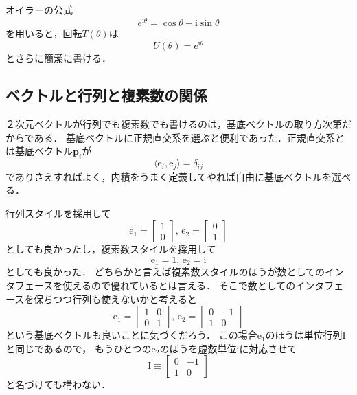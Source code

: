\documentclass{jsbook}
\newcommand{\one}{1}%
\newcommand{\One}{\mathrm{I}}%
\newcommand{\im}{\mathrm{i}}%
\newcommand{\I}{\mathrm{I}}%
\newcommand{\ee}{\mathit{e}}
\newcommand{\bvec}[1]{\boldsymbol{#1}}
\newcommand{\ve}{\mathrm{e}}
\begin{document}
オイラーの公式
\begin{equation}
\ee^{\im\theta}=\cos\theta+\im\sin\theta
\end{equation}
を用いると，回転$T(\theta)$は
\begin{equation}
U(\theta)=\ee^{\im\theta}
\end{equation}
とさらに簡潔に書ける．

\subsection{ベクトルと行列と複素数の関係}

２次元ベクトルが行列でも複素数でも書けるのは，基底ベクトルの取り方次第だからである．
基底ベクトルに正規直交系を選ぶと便利であった．正規直交系とは基底ベクトル$\bvec{p}_i$が
\begin{equation}
\langle\ve_i,\ve_j\rangle=\delta_{ij}
\end{equation}
でありさえすればよく，内積をうまく定義してやれば自由に基底ベクトルを選べる．

行列スタイルを採用して
\begin{equation}
\ve_1=\begin{bmatrix}1\\0\end{bmatrix},\,
\ve_2=\begin{bmatrix}0\\1\end{bmatrix}
\end{equation}
としても良かったし，複素数スタイルを採用して
\begin{equation}
\ve_1=\one,\,
\ve_2=\im
\end{equation}
としても良かった．
どちらかと言えば複素数スタイルのほうが数としてのインタフェースを使えるので優れているとは言える．
そこで数としてのインタフェースを保ちつつ行列も使えないかと考えると
\begin{equation}
\ve_1=\begin{bmatrix}1&0\\0&1\end{bmatrix},\,
\ve_2=\begin{bmatrix}0&-1\\1&0\end{bmatrix}
\end{equation}
という基底ベクトルも良いことに気づくだろう．
この場合$\ve_1$のほうは単位行列$\One$と同じであるので，
もうひとつの$\ve_2$のほうを虚数単位$\im$に対応させて
\begin{equation}
\I\equiv\begin{bmatrix}0&-1\\1&0\end{bmatrix}
\end{equation}
と名づけても構わない．
%
%
\end{document}
